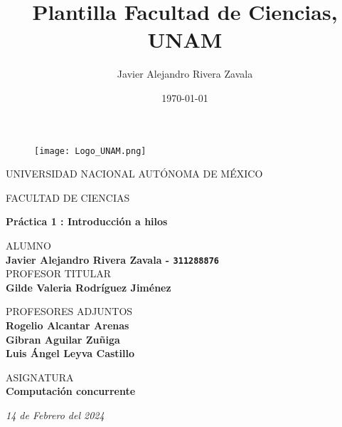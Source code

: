 \documentclass{article}
\title{Plantilla Facultad de Ciencias, UNAM}
\author{Javier Alejandro Rivera Zavala}
\date{\today}
\begin{document}
\thispagestyle{empty}
	
	\begin{figure}[ht]
	  	\begin{center}
        \texttt{[image: Logo\_UNAM.png]}
		\label{EscudoUNAM}
        \end{center}	     
	\end{figure}
	
	\begin{center}
	\vspace{0.8cm}
	\LARGE
	UNIVERSIDAD NACIONAL AUTÓNOMA DE MÉXICO 
	
	\vspace{0.7cm}
	\LARGE
	FACULTAD DE CIENCIAS
	
	\vspace{0.8 cm}	
	\Large
	\textbf{Práctica 1 : Introducción a hilos}

	\vspace{0.8 cm}
	\normalsize	
	ALUMNO\\
	\vspace{.2cm}
	\large   
    \textbf{Javier Alejandro Rivera Zavala  - \texttt{311288876}}\\   
	\vspace{1 cm}
	\normalsize	
	PROFESOR TITULAR\\
	\vspace{.2cm}
	\large
	\textbf{Gilde Valeria Rodríguez Jiménez}
	
	\vspace{1 cm}
	PROFESORES ADJUNTOS \\
	\vspace{.2cm}
	\large
	\textbf{Rogelio Alcantar Arenas}\\	
    \textbf{Gibran Aguilar Zuñiga}\\	
    \textbf{Luis Ángel Leyva Castillo}\\	
	\vspace{1.3cm}
	
	\normalsize	
	ASIGNATURA \\
	\vspace{.2cm}
	\large
	\textbf{Computación concurrente}
	
	\vspace{1 cm}
	\textit{14 de Febrero del 2024}
	\end{center}
        \newpage
        
\end{document}
